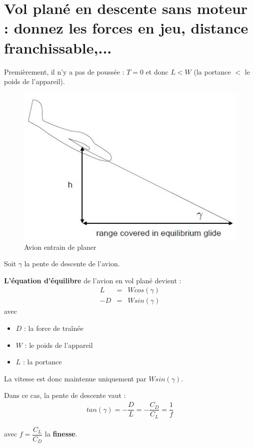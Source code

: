 \documentclass{report}
\begin{document}
 

\section{Vol plané en descente sans moteur : donnez les forces en jeu, distance franchissable,...}

Premièrement, il n'y a pas de poussée : $T=0$ et donc $L<W$ (la portance $<$ le poids de l'appareil).

\begin{figure}[h!]
    \centering
    \includegraphics[scale=0.6]{12.JPG}
    \caption{Avion entrain de planer}
    \label{12}
\end{figure}

Soit $\gamma$ la pente de descente de l'avion.

\textbf{L'équation d'équilibre} de l'avion en vol plané devient :
\begin{eqnarray}
L &= &Wcos(\gamma)\\
-D &= &W sin(\gamma)
\end{eqnarray}
avec \begin{itemize}
    \item $D$ : la force de traînée
    \item $W$ : le poids de l'appareil
    \item $L$ : la portance
\end{itemize}

La vitesse est donc maintenue uniquement par $W sin(\gamma)$.

Dans ce cas, la pente de descente vaut :
\begin{eqnarray}
tan(\gamma) = -\dfrac{D}{L} = -\dfrac{C_D}{C_L} = \dfrac{1}{f}
\end{eqnarray}

avec $f=\dfrac{C_L}{C_D}$ la \textbf{finesse}.
\end{document}
